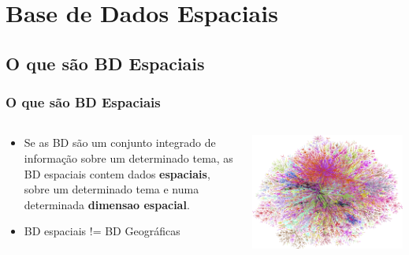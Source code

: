 \documentclass[hyperref={pdfpagelabels=true}]{beamer}
\begin{document}
\section{Base de Dados Espaciais}

\subsection{O que s\~{a}o BD Espaciais} 
\begin{frame}
\frametitle{O que s\~{a}o BD Espaciais}
\begin{columns}
  \begin{column}{7cm}
    \begin{itemize}
      \item<1-> Se as BD s\~{a}o um conjunto integrado de informa\c{c}\~{a}o sobre um determinado tema, as BD espaciais contem dados \textbf{espaciais}, sobre um determinado tema e numa determinada \textbf{dimensao espacial}.
      \item<2-> BD espaciais != BD Geogr\'{a}ficas
      \end{itemize}
  \end{column}
  \begin{column}{10cm}
    \includegraphics[scale=0.4]{wired.png}
  \end{column}  
\end{columns}
\end{frame}
\end{document}
